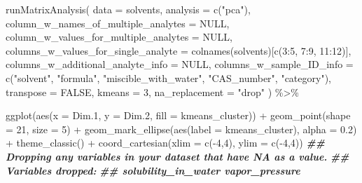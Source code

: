 \documentclass[
]{krantz}
\newenvironment{Shaded}{\begin{snugshade}}{\end{snugshade}}
\newcommand{\AttributeTok}[1]{\textcolor[rgb]{0.77,0.63,0.00}{#1}}
\newcommand{\ConstantTok}[1]{\textcolor[rgb]{0.00,0.00,0.00}{#1}}
\newcommand{\DecValTok}[1]{\textcolor[rgb]{0.00,0.00,0.81}{#1}}
\newcommand{\DocumentationTok}[1]{\textcolor[rgb]{0.56,0.35,0.01}{\textbf{\textit{#1}}}}
\newcommand{\FloatTok}[1]{\textcolor[rgb]{0.00,0.00,0.81}{#1}}
\newcommand{\FunctionTok}[1]{\textcolor[rgb]{0.00,0.00,0.00}{#1}}
\newcommand{\NormalTok}[1]{#1}
\newcommand{\SpecialCharTok}[1]{\textcolor[rgb]{0.00,0.00,0.00}{#1}}
\newcommand{\StringTok}[1]{\textcolor[rgb]{0.31,0.60,0.02}{#1}}
\begin{document}
\begin{Shaded}
\begin{Highlighting}[]
\FunctionTok{runMatrixAnalysis}\NormalTok{(}
  \AttributeTok{data =}\NormalTok{ solvents,}
  \AttributeTok{analysis =} \FunctionTok{c}\NormalTok{(}\StringTok{"pca"}\NormalTok{),}
  \AttributeTok{column\_w\_names\_of\_multiple\_analytes =} \ConstantTok{NULL}\NormalTok{,}
  \AttributeTok{column\_w\_values\_for\_multiple\_analytes =} \ConstantTok{NULL}\NormalTok{,}
  \AttributeTok{columns\_w\_values\_for\_single\_analyte =} \FunctionTok{colnames}\NormalTok{(solvents)[}\FunctionTok{c}\NormalTok{(}\DecValTok{3}\SpecialCharTok{:}\DecValTok{5}\NormalTok{, }\DecValTok{7}\SpecialCharTok{:}\DecValTok{9}\NormalTok{, }\DecValTok{11}\SpecialCharTok{:}\DecValTok{12}\NormalTok{)],}
  \AttributeTok{columns\_w\_additional\_analyte\_info =} \ConstantTok{NULL}\NormalTok{,}
  \AttributeTok{columns\_w\_sample\_ID\_info =} \FunctionTok{c}\NormalTok{(}\StringTok{"solvent"}\NormalTok{, }\StringTok{"formula"}\NormalTok{, }\StringTok{"miscible\_with\_water"}\NormalTok{, }\StringTok{"CAS\_number"}\NormalTok{, }\StringTok{"category"}\NormalTok{),}
  \AttributeTok{transpose =} \ConstantTok{FALSE}\NormalTok{,}
  \AttributeTok{kmeans =} \DecValTok{3}\NormalTok{,}
  \AttributeTok{na\_replacement =} \StringTok{"drop"}
\NormalTok{) }\SpecialCharTok{\%\textgreater{}\%}

\FunctionTok{ggplot}\NormalTok{(}\FunctionTok{aes}\NormalTok{(}\AttributeTok{x =}\NormalTok{ Dim}\FloatTok{.1}\NormalTok{, }\AttributeTok{y =}\NormalTok{ Dim}\FloatTok{.2}\NormalTok{, }\AttributeTok{fill =}\NormalTok{ kmeans\_cluster)) }\SpecialCharTok{+}
  \FunctionTok{geom\_point}\NormalTok{(}\AttributeTok{shape =} \DecValTok{21}\NormalTok{, }\AttributeTok{size =} \DecValTok{5}\NormalTok{) }\SpecialCharTok{+}
  \FunctionTok{geom\_mark\_ellipse}\NormalTok{(}\FunctionTok{aes}\NormalTok{(}\AttributeTok{label =}\NormalTok{ kmeans\_cluster), }\AttributeTok{alpha =} \FloatTok{0.2}\NormalTok{) }\SpecialCharTok{+}
  \FunctionTok{theme\_classic}\NormalTok{() }\SpecialCharTok{+}
  \FunctionTok{coord\_cartesian}\NormalTok{(}\AttributeTok{xlim =} \FunctionTok{c}\NormalTok{(}\SpecialCharTok{{-}}\DecValTok{4}\NormalTok{,}\DecValTok{4}\NormalTok{), }\AttributeTok{ylim =} \FunctionTok{c}\NormalTok{(}\SpecialCharTok{{-}}\DecValTok{4}\NormalTok{,}\DecValTok{4}\NormalTok{))}
\DocumentationTok{\#\# Dropping any variables in your dataset that have NA as a value.}
\DocumentationTok{\#\# Variables dropped:}
\DocumentationTok{\#\# solubility\_in\_water vapor\_pressure}
\end{Highlighting}
\end{Shaded}
\end{document}
